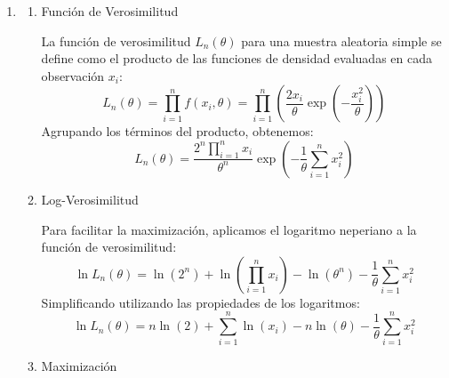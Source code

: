 \begin{enumerate}[label=\color{red}\textbf{\arabic*)}]
\begin{enumerate}[label=\arabic*)]
		      \item Error cuadrático medio para el estimador de máxima verosimilitud de $\mu$

		            El error cuadrático medio (ECM) se descompone como $\mathrm{Var}(\hat{\theta})+[\mathrm{sesgo}(\hat{\theta})]^2$.

		            Como hemos demostrado antes que el sesgo es nulo, el ECM coincide con la varianza del estimador: \[
			            ECM(\hat{\mu})=\mathrm{Var}(\hat{\mu})=\mathrm{Var}(\bar{X})
		            \]
		            Calculamos la varianza de la media muestral: \[
			            \mathrm{Var}(\bar{X})=\mathrm{Var}\left( \dfrac{1}{n}\sum_{i=1}^{n} X_i \right) =\dfrac{1}{n^2}\sum_{i=1}^{n} \mathrm{Var}(X_i)
		            \]
		            Como la muestra es aleatoria simple (las variables son independientes) y $\mathrm{Var}(X_i)=\sigma^2$: \[
			            ECM(\hat{\mu})=\dfrac{1}{n^2}(n\sigma^2)=\dfrac{\sigma^2}{n}
		            \]
	      \end{enumerate}
	\item {}
	      \begin{enumerate}[label=\arabic*)]
		      \item Función de Verosimilitud

		            La función de verosimilitud $L_n(\theta)$ para una muestra aleatoria simple se define como el producto de las funciones de densidad evaluadas en cada observación $x_i$: \[
			            L_n(\theta)=\prod_{i=1}^{n} f(x_i,\theta)=\prod_{i=1}^{n} \left( \dfrac{2x_i}{\theta}\exp \left( -\dfrac{x_i^2}{\theta} \right)  \right)
		            \]
		            Agrupando los términos del producto, obtenemos: \[
			            L_n(\theta)=\dfrac{2^n \prod_{i=1}^{n} x_i }{\theta^n}\exp \left( -\dfrac{1}{\theta}\sum_{i=1}^{n} x_i^2 \right)
		            \]
		      \item Log-Verosimilitud

		            Para facilitar la maximización, aplicamos el logaritmo neperiano a la función de verosimilitud: \[
			            \ln L_n(\theta)=\ln(2^n)+\ln \left( \prod_{i=1}^{n} x_i  \right) -\ln(\theta^n)-\dfrac{1}{\theta} \sum_{i=1}^{n} x_i^2
		            \]
		            Simplificando utilizando las propiedades de los logaritmos: \[
			            \ln L_n(\theta)=n \ln(2)+\sum_{i=1}^{n} \ln(x_i)-n \ln(\theta)-\dfrac{1}{\theta} \sum_{i=1}^{n} x_i^2
		            \]
		      \item Maximización


\end{enumerate}
\end{enumerate}
